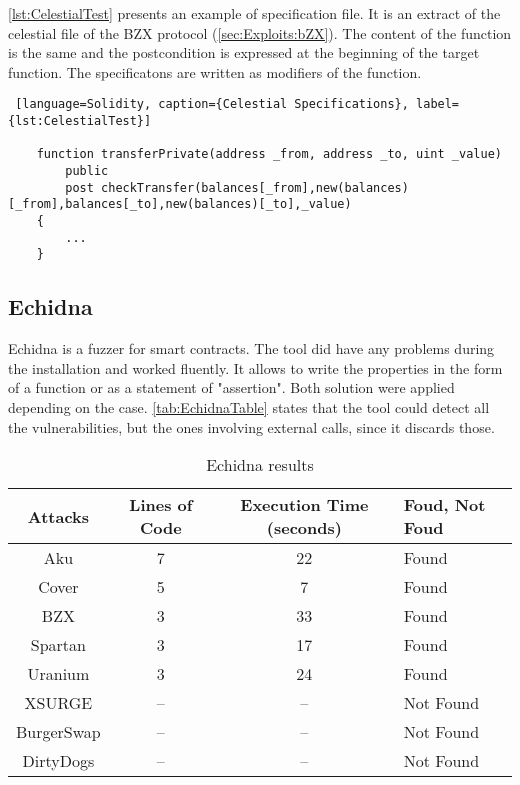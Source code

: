 \autoref{lst:CelestialTest} presents an example of specification file. 
It is an extract of the celestial file of the BZX protocol (\autoref*{sec:Exploits:bZX}). 
The content of the function is the same and the postcondition is expressed at the beginning of the target function.
The specificatons are written as modifiers of the function.  

\begin{lstlisting} [language=Solidity, caption={Celestial Specifications}, label={lst:CelestialTest}]

    function transferPrivate(address _from, address _to, uint _value)
        public
        post checkTransfer(balances[_from],new(balances)[_from],balances[_to],new(balances)[_to],_value)
    {
        ...
    }
\end{lstlisting} 
\subsection*{Echidna} Echidna is a fuzzer for smart contracts. The tool did have any problems during the installation and worked fluently.
It allows to write the properties in the form of a function or as a statement of "assertion". Both solution were applied depending on the case.
\autoref{tab:EchidnaTable} states that the tool could detect all the vulnerabilities,
but the ones involving external calls, since it discards those.

\begin{center}
    \begin{table*}    
        \caption{Echidna results}
        \label{tab:EchidnaTable}
        \begin{tabular}{cccl}
        \toprule
            Attacks & Lines of Code & Execution Time (seconds) & Foud, Not Foud\\
            \midrule
            Aku & 7 & 22 & Found\\ 
            Cover & 5 & 7 & Found\\ 
            BZX & 3 & 33 & Found \\ 
            Spartan & 3 & 17 & Found  \\ 
            Uranium & 3 & 24 & Found \\ 
            XSURGE & -- & -- & Not Found \\  
            BurgerSwap &  -- & -- & Not Found \\ 
            DirtyDogs &  -- & -- & Not Found \\
        \bottomrule
        \end{tabular}
    \end{table*}
\end{center}

